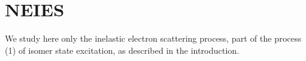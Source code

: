 \chapter{NEIES}

We study here only the inelastic electron scattering process, part of the process (1) of isomer state excitation, as described in the introduction.



